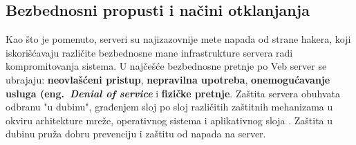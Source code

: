 \documentclass[a4paper]{article}
\begin{document}
\subsection{Bezbednosni propusti i načini otklanjanja}
\label{sec:propusti}
Kao što je pomenuto, serveri su najizazovnije mete napada od strane hakera, koji iskorišćavaju različite bezbednosne mane infrastrukture servera radi kompromitovanja sistema. U najčešće bezbednosne pretnje po Veb server se ubrajaju: \textbf{neovlašćeni pristup}, \textbf{nepravilna upotreba}, \textbf{onemogućavanje usluga (eng.~{\em Denial of service}} i \textbf{fizičke pretnje}. Zaštita servera obuhvata odbranu "u dubinu", građenjem sloj po sloj različitih zaštitnih mehanizama u okviru arhitekture mreže, operativnog sistema i aplikativnog sloja  \cite{wssg}. Zaštita u dubinu pruža dobru prevenciju i zaštitu od napada na server.
\end{document}
